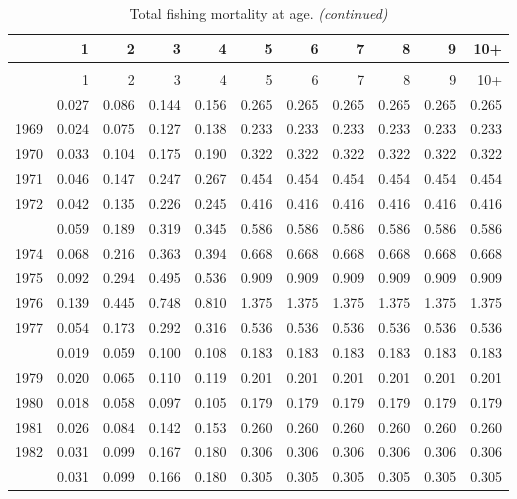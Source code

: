 \documentclass[
]{article}
\begin{document}
\begin{longtable}[t]{lrrrrrrrrrr}
\caption{\label{tab:FAA-tot-table}Total fishing mortality at age.}\\
\toprule
  & 1 & 2 & 3 & 4 & 5 & 6 & 7 & 8 & 9 & 10+\\
\midrule
\endfirsthead
\caption[]{Total fishing mortality at age. \textit{(continued)}}\\
\toprule
  & 1 & 2 & 3 & 4 & 5 & 6 & 7 & 8 & 9 & 10+\\
\midrule
\endhead

\endfoot
\bottomrule
\endlastfoot
1968 & 0.027 & 0.086 & 0.144 & 0.156 & 0.265 & 0.265 & 0.265 & 0.265 & 0.265 & 0.265\\
1969 & 0.024 & 0.075 & 0.127 & 0.138 & 0.233 & 0.233 & 0.233 & 0.233 & 0.233 & 0.233\\
1970 & 0.033 & 0.104 & 0.175 & 0.190 & 0.322 & 0.322 & 0.322 & 0.322 & 0.322 & 0.322\\
1971 & 0.046 & 0.147 & 0.247 & 0.267 & 0.454 & 0.454 & 0.454 & 0.454 & 0.454 & 0.454\\
1972 & 0.042 & 0.135 & 0.226 & 0.245 & 0.416 & 0.416 & 0.416 & 0.416 & 0.416 & 0.416\\
\addlinespace
1973 & 0.059 & 0.189 & 0.319 & 0.345 & 0.586 & 0.586 & 0.586 & 0.586 & 0.586 & 0.586\\
1974 & 0.068 & 0.216 & 0.363 & 0.394 & 0.668 & 0.668 & 0.668 & 0.668 & 0.668 & 0.668\\
1975 & 0.092 & 0.294 & 0.495 & 0.536 & 0.909 & 0.909 & 0.909 & 0.909 & 0.909 & 0.909\\
1976 & 0.139 & 0.445 & 0.748 & 0.810 & 1.375 & 1.375 & 1.375 & 1.375 & 1.375 & 1.375\\
1977 & 0.054 & 0.173 & 0.292 & 0.316 & 0.536 & 0.536 & 0.536 & 0.536 & 0.536 & 0.536\\
\addlinespace
1978 & 0.019 & 0.059 & 0.100 & 0.108 & 0.183 & 0.183 & 0.183 & 0.183 & 0.183 & 0.183\\
1979 & 0.020 & 0.065 & 0.110 & 0.119 & 0.201 & 0.201 & 0.201 & 0.201 & 0.201 & 0.201\\
1980 & 0.018 & 0.058 & 0.097 & 0.105 & 0.179 & 0.179 & 0.179 & 0.179 & 0.179 & 0.179\\
1981 & 0.026 & 0.084 & 0.142 & 0.153 & 0.260 & 0.260 & 0.260 & 0.260 & 0.260 & 0.260\\
1982 & 0.031 & 0.099 & 0.167 & 0.180 & 0.306 & 0.306 & 0.306 & 0.306 & 0.306 & 0.306\\
\addlinespace
1983 & 0.031 & 0.099 & 0.166 & 0.180 & 0.305 & 0.305 & 0.305 & 0.305 & 0.305 & 0.305\\

\end{longtable}
\end{document}
